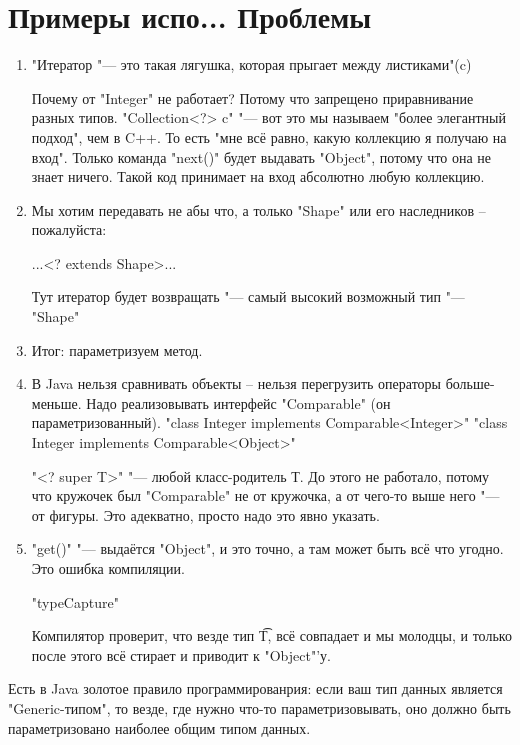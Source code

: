 \section{Примеры испо... Проблемы}
\begin{enumerate}
	\item
		"Итератор "--- это такая лягушка, которая прыгает между листиками"(c)

		Почему от \java"Integer" не работает? Потому что запрещено приравнивание разных типов.
		\java"Collection<?> c" "--- вот это мы называем "более элегантный подход", чем в C++.
		То есть "мне всё равно, какую коллекцию я получаю на вход".
		Только команда \java"next()" будет выдавать \java"Object", потому что она не знает ничего.
		Такой код принимает на вход абсолютно любую коллекцию.
	\item
		Мы хотим передавать не абы что, а только \java"Shape" или его наследников -- пожалуйста:
		\begin{javacode}
		...<? extends Shape>...
		\end{javacode}
		Тут итератор будет возвращать "--- самый высокий возможный тип "--- \java"Shape"
	\item
		Итог: параметризуем метод.
	\item
		В Java нельзя сравнивать объекты -- нельзя перегрузить операторы больше-меньше. Надо реализовывать интерфейс \java"Comparable"
		(он параметризованный).
		\java"class Integer implements Comparable<Integer>"
		\java"class Integer implements Comparable<Object>"
	
		\java"<? super T>" "--- любой класс-родитель Т.
		До этого не работало, потому что кружочек был \java"Comparable" не от кружочка, а от чего-то выше него "--- от фигуры. 
		Это адекватно, просто надо это явно указать.

	\item
		\java"get()" "--- выдаётся \java"Object", и это точно, а там может быть всё что угодно. Это ошибка компиляции.

		\java"typeCapture"

		Компилятор проверит, что везде тип \t{T}, всё совпадает и мы молодцы, и только после этого всё стирает и приводит к \java"Object"'у.
\end{enumerate}

Есть в Java золотое правило программированрия: если ваш тип данных является \java"Generic-типом", 
то везде, где нужно что-то параметризовывать, оно должно быть параметризовано наиболее общим типом данных.

